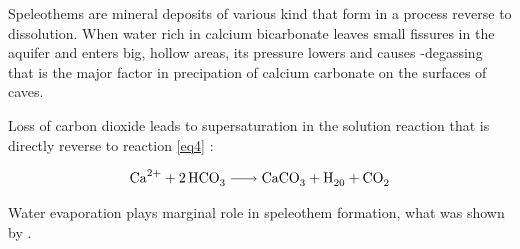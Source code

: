 Speleothems are mineral deposits of various kind that form in a process reverse
to dissolution. When water rich in calcium bicarbonate leaves small fissures in
the aquifer and enters big, hollow areas, its pressure lowers and causes
-degassing that is the major factor in precipation of calcium carbonate
on the surfaces of caves.

Loss of carbon dioxide leads to supersaturation in the solution reaction that
is directly reverse to reaction \ref{eq4} \parencite{fairchild2012speleothem}:

\begin{equation}
  \ce{Ca^2+ + 2HCO3 -> CaCO3 + H20 + CO2}
  \label{eq:precipation}
\end{equation}

Water evaporation plays marginal role in speleothem formation, what was shown
by \cite{holland1964cave}.

